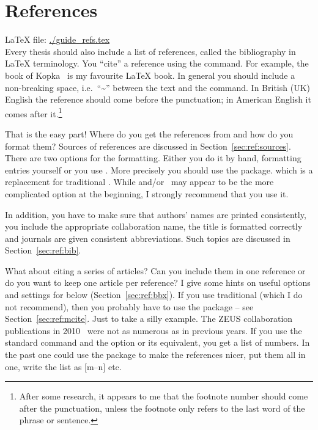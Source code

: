 \chapter{References}
\label{sec:ref}

\LaTeX{} file: \url{./guide_refs.tex}\\[1ex]
\noindent
Every thesis should also include a list of references, called the
bibliography in \LaTeX{} terminology. You \enquote{cite} a reference using
the  command. For example, the book of
Kopka~\cite{kopka04} is my favourite \LaTeX{} book. In general you
should include a non-breaking space, i.e.\ \enquote{\textasciitilde} between
the text and the  command. In British (UK) English the reference
should come before the punctuation; in American English it comes after
it.\footnote{After some research, it appears to me that the footnote
  number should come after the punctuation, unless the footnote only
  refers to the last word of the phrase or sentence.}

That is the easy part!  Where do you get the references from and how
do you format them? Sources of references are discussed in
Section~\ref{sec:ref:sources}.
There are two options for the formatting. Either you do it by
hand, formatting  entries yourself or you use
\BibTeX. 
More precisely you should use the  package.
which is a replacement for traditional \BibTeX.
While  and/or \BibTeX\ may appear to be the more complicated option
at the beginning, I strongly recommend that you use it.

In addition, you have to make sure that authors' names are
printed consistently, you include the appropriate collaboration
name, the title is formatted correctly and journals are given
consistent abbreviations. Such topics are discussed in
Section~\ref{sec:ref:bib}.

What about citing a series of articles? Can you
include them in one reference or do you want to keep one article per
reference?
I give some hints on
useful options and settings for  below (Section~\ref{sec:ref:bbx}).
If you use traditional \BibTeX (which I do not recommend), then you probably have to use the 
package -- see Section~\ref{sec:ref:mcite}.
Just to take a silly example. The ZEUS collaboration
publications in
2010~\cite{Abramowicz:2010ih,Abramowicz:2010xc,Abramowicz:2010nj} were
not as numerous as in previous years. If you use the standard
 command and the  option or its equivalent,
you get a list of numbers.  In the past one could use the
 package to make the references nicer, put them all in
one, write the list as [m--n] etc.


